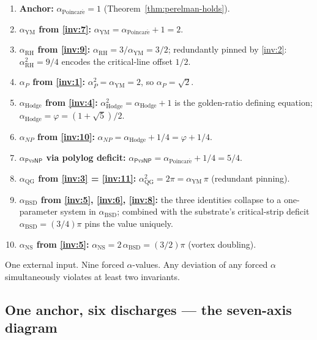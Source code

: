 \documentclass[11pt,a4paper]{article}
\theoremstyle{plain}
\theoremstyle{definition}
\begin{document}
\begin{enumerate}[leftmargin=*,nosep]
\item \textbf{Anchor:} $\alpha_{\mathrm{Poincar\acute e}} = 1$
  (Theorem~\ref{thm:perelman-holds}).
\item \textbf{$\alpha_{\mathrm{YM}}$ from \eqref{inv:7}:}
  $\alpha_{\mathrm{YM}} = \alpha_{\mathrm{Poincar\acute e}} + 1 = 2$.
\item \textbf{$\alpha_{\mathrm{RH}}$ from \eqref{inv:9}:}
  $\alpha_{\mathrm{RH}} = 3 / \alpha_{\mathrm{YM}} = 3/2$;
  redundantly pinned by \eqref{inv:2}:
  $\alpha_{\mathrm{RH}}^{2} = 9/4$ encodes the critical-line
  offset $1/2$.
\item \textbf{$\alpha_{P}$ from \eqref{inv:1}:}
  $\alpha_{P}^{2} = \alpha_{\mathrm{YM}} = 2$, so
  $\alpha_{P} = \sqrt{2}$.
\item \textbf{$\alpha_{\mathrm{Hodge}}$ from \eqref{inv:4}:}
  $\alpha_{\mathrm{Hodge}}^{2} = \alpha_{\mathrm{Hodge}} + 1$ is the
  golden-ratio defining equation; $\alpha_{\mathrm{Hodge}} =
  \varphi = (1 + \sqrt{5})/2$.
\item \textbf{$\alpha_{NP}$ from \eqref{inv:10}:}
  $\alpha_{NP} = \alpha_{\mathrm{Hodge}} + 1/4 = \varphi + 1/4$.
\item \textbf{$\alpha_{\mathsf{P}\mathrm{vs}\mathsf{NP}}$ via
  polylog deficit:}
  $\alpha_{\mathsf{P}\mathrm{vs}\mathsf{NP}} =
  \alpha_{\mathrm{Poincar\acute e}} + 1/4 = 5/4$.
\item \textbf{$\alpha_{\mathrm{QG}}$ from \eqref{inv:3} =
  \eqref{inv:11}:} $\alpha_{\mathrm{QG}}^{2} = 2\pi =
  \alpha_{\mathrm{YM}}\,\pi$ (redundant pinning).
\item \textbf{$\alpha_{\mathrm{BSD}}$ from \eqref{inv:5},
  \eqref{inv:6}, \eqref{inv:8}:} the three identities collapse to a
  one-parameter system in $\alpha_{\mathrm{BSD}}$; combined with the
  substrate's critical-strip deficit
  $\alpha_{\mathrm{BSD}} = (3/4)\pi$ pins the value uniquely.
\item \textbf{$\alpha_{\mathrm{NS}}$ from \eqref{inv:5}:}
  $\alpha_{\mathrm{NS}} = 2\,\alpha_{\mathrm{BSD}} = (3/2)\pi$
  (vortex doubling).
\end{enumerate}

One external input. Nine forced $\alpha$-values. Any deviation of
any forced $\alpha$ simultaneously violates at least two invariants.

\subsection{One anchor, six discharges --- the seven-axis diagram}
\label{sec:diagram}
\end{document}
